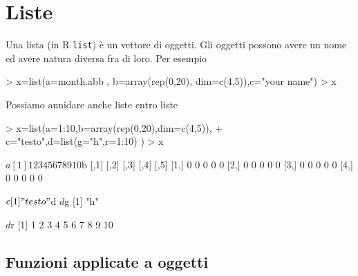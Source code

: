 \documentclass[onecolumn,12pt]{book}
\begin{document}
\section{Liste}
Una lista (in \textsf{R} \texttt{list}) \`e un vettore di oggetti.  Gli oggetti possono avere un nome ed avere natura diversa fra di loro. 
Per esempio
\begin{Schunk}
\begin{Sinput}
> x=list(a=month.abb , b=array(rep(0,20), dim=c(4,5)),c="your name")
> x
\end{Sinput}
\end{Schunk}
Possiamo annidare anche liste entro liste
\begin{Schunk}
\begin{Sinput}
> x=list(a=1:10,b=array(rep(0,20),dim=c(4,5)),
+ c="testo",d=list(g="h",r=1:10) )
> x
\end{Sinput}
\begin{Soutput}
$a
 [1]  1  2  3  4  5  6  7  8  9 10

$b
     [,1] [,2] [,3] [,4] [,5]
[1,]    0    0    0    0    0
[2,]    0    0    0    0    0
[3,]    0    0    0    0    0
[4,]    0    0    0    0    0

$c
[1] "testo"

$d
$d$g
[1] "h"

$d$r
 [1]  1  2  3  4  5  6  7  8  9 10
\end{Soutput}
\end{Schunk}
\subsection{Funzioni applicate a oggetti}
\end{document}
